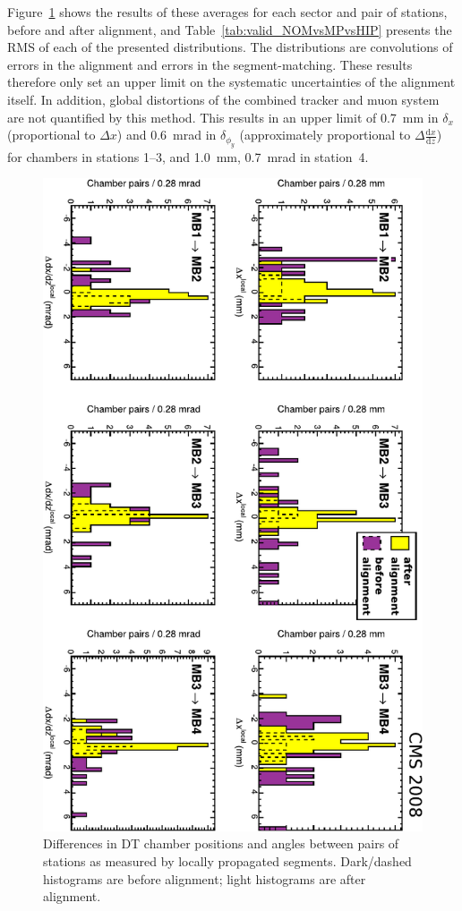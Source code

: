 Figure~\ref{fig:valid_NOMvsMPvsHIP} shows the results of these
averages for each sector and pair of stations, before and after
alignment, and Table~\ref{tab:valid_NOMvsMPvsHIP} presents the RMS of
each of the presented distributions.  The distributions are convolutions of
errors in the alignment and errors in the segment-matching.  These results
therefore only set an upper limit on the
systematic uncertainties of the alignment itself.  In addition, global
distortions of the combined tracker and muon system are not quantified
by this method.  This results in an upper limit of 0.7~mm in
$\delta_x$ (proportional to $\Delta x$) and 0.6~mrad in
$\delta_{\phi_y}$ (approximately proportional to
$\Delta \frac{\textrm{d}x}{\textrm{d}z}$) for chambers in stations 1--3, and 1.0~mm,
0.7~mrad in station~4.

\begin{figure}[p]
  \centering
  \includegraphics[height=\linewidth, angle=90]{plots/validation/segment_extrapolation.pdf}

  \caption{Differences in DT chamber positions and angles between pairs
  of stations as measured by locally propagated
  segments.  Dark/dashed histograms are before alignment; light histograms
  are after alignment.  \label{fig:valid_NOMvsMPvsHIP}}
\end{figure}

